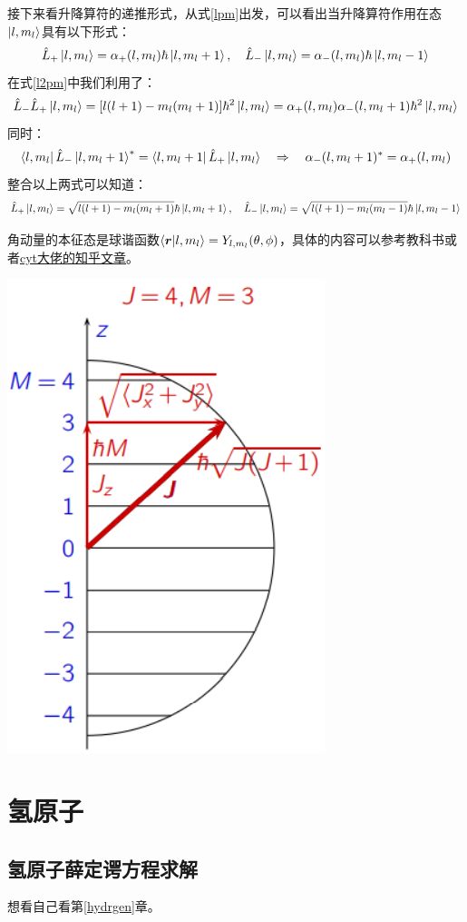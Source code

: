 接下来看升降算符的递推形式，从式\ref{lpm}出发，可以看出当升降算符作用在态$\ket{l,m_l}$具有以下形式：
\[\hat{L}_+\ket{l,m_l}=\alpha_+(l,m_l)\hbar\ket{l,m_l+1}, \quad \hat{L}_-\ket{l,m_l}=\alpha_-(l,m_l)\hbar\ket{l,m_l-1}\]
在式\ref{l2pm}中我们利用了：
\[\hat{L}_-\hat{L}_+\ket{l,m_l}=[l(l+1)-m_l(m_l+1)]\hbar^2\ket{l,m_l}=\alpha_+(l,m_l)\alpha_-(l,m_l+1)\hbar^2\ket{l,m_l}\]
同时：
\[\bra{l,m_l}\hat{L}_-\ket{l,m_l+1}^*=\bra{l,m_l+1}\hat{L}_+\ket{l,m_l} \quad \Rightarrow \quad \alpha_-(l,m_l+1)^*=\alpha_+(l,m_l)\]
整合以上两式可以知道：
\[\hat{L}_+\ket{l,m_l}=\sqrt{l(l+1)-m_l(m_l+1)}\hbar\ket{l,m_l+1}, \quad \hat{L}_-\ket{l,m_l}=\sqrt{l(l+1)-m_l(m_l-1)}\hbar\ket{l,m_l-1}\]

角动量的本征态是球谐函数$\bra{\bm{r}}\ket{l,m_l}=Y_{l,m_l}(\theta,\phi)$，具体的内容可以参考教科书或者\href{https://zhuanlan.zhihu.com/p/419492575}{cyt大佬的知乎文章}。

\begin{center}
    \includegraphics[scale=0.55]{fig/lzhx/微信图片_20211026130340.png}
\end{center}

\section{氢原子}
\subsection{氢原子薛定谔方程求解}
想看自己看第\ref{hydrgen}章。

